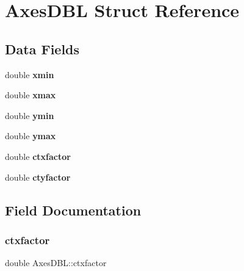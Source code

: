 \hypertarget{struct_axes_d_b_l}{}\section{Axes\+D\+BL Struct Reference}
\label{struct_axes_d_b_l}
\subsection*{Data Fields}
\begin{DoxyCompactItemize}
\item 
\mbox{\label{struct_axes_d_b_l_ae8d972bf03fcc9b9b103c7ab039a7e15}} 
double {\bfseries xmin}
\item 
\mbox{\label{struct_axes_d_b_l_a44a84c7223681783283927b8877afede}} 
double {\bfseries xmax}
\item 
\mbox{\label{struct_axes_d_b_l_aad750ce794560a6cb58da22a29969a2e}} 
double {\bfseries ymin}
\item 
\mbox{\label{struct_axes_d_b_l_afd77303b336f75e23687ed30d01124a9}} 
double {\bfseries ymax}
\item 
\mbox{\label{struct_axes_d_b_l_aca6c1fed110e22d0fe0a6cfcd3f4d93e}} 
double {\bfseries ctxfactor}
\item 
\mbox{\label{struct_axes_d_b_l_a11513e052101867dae5751ae717f8365}} 
double {\bfseries ctyfactor}
\end{DoxyCompactItemize}


\subsection{Field Documentation}
\mbox{\label{struct_axes_d_b_l_aca6c1fed110e22d0fe0a6cfcd3f4d93e}} 
\subsubsection{\texorpdfstring{ctxfactor}{ctxfactor}}
{\footnotesize\ttfamily double Axes\+D\+B\+L\+::ctxfactor}

